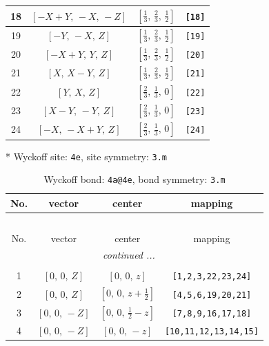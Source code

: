 \documentclass[fleqn,8pt]{jsarticle}
\begin{document}
\begin{longtable}{cccc}
18 & $\left[ - X + Y,\, - X,\, - Z \right]$ & $\left[ \frac{1}{3},\, \frac{2}{3},\, \frac{1}{2} \right]$ & {\tt [18]} \\ \hline
19 & $\left[ - Y,\, - X,\, Z \right]$ & $\left[ \frac{1}{3},\, \frac{2}{3},\, \frac{1}{2} \right]$ & {\tt [19]} \\ \hline
20 & $\left[ - X + Y,\, Y,\, Z \right]$ & $\left[ \frac{1}{3},\, \frac{2}{3},\, \frac{1}{2} \right]$ & {\tt [20]} \\ \hline
21 & $\left[ X,\, X - Y,\, Z \right]$ & $\left[ \frac{1}{3},\, \frac{2}{3},\, \frac{1}{2} \right]$ & {\tt [21]} \\ \hline
22 & $\left[ Y,\, X,\, Z \right]$ & $\left[ \frac{2}{3},\, \frac{1}{3},\, 0 \right]$ & {\tt [22]} \\ \hline
23 & $\left[ X - Y,\, - Y,\, Z \right]$ & $\left[ \frac{2}{3},\, \frac{1}{3},\, 0 \right]$ & {\tt [23]} \\ \hline
24 & $\left[ - X,\, - X + Y,\, Z \right]$ & $\left[ \frac{2}{3},\, \frac{1}{3},\, 0 \right]$ & {\tt [24]} \\
\end{longtable}
* Wyckoff site: {\tt 4e}, site symmetry: {\tt 3.m}
\renewcommand{\arraystretch}{1.2}
\begin{longtable}{cccc}
\caption{Wyckoff bond: {\tt 4a@4e}, bond symmetry: {\tt 3.m}}
 \\
 \hline \hline
No. & vector & center & mapping \\ \hline \endfirsthead

\multicolumn{3}{l}{\tablename\ \thetable{}} \\
 \hline \hline
No. & vector & center & mapping \\ \hline \endhead

 \hline \hline
\multicolumn{3}{r}{\footnotesize\it continued ...} \\ \endfoot

 \hline \hline
\multicolumn{3}{r}{} \\ \endlastfoot

1 & $\left[ 0,\, 0,\, Z \right]$ & $\left[ 0,\, 0,\, z \right]$ & {\tt [1,2,3,22,23,24]} \\ \hline
2 & $\left[ 0,\, 0,\, Z \right]$ & $\left[ 0,\, 0,\, z + \frac{1}{2} \right]$ & {\tt [4,5,6,19,20,21]} \\ \hline
3 & $\left[ 0,\, 0,\, - Z \right]$ & $\left[ 0,\, 0,\, \frac{1}{2} - z \right]$ & {\tt [7,8,9,16,17,18]} \\ \hline
4 & $\left[ 0,\, 0,\, - Z \right]$ & $\left[ 0,\, 0,\, - z \right]$ & {\tt [10,11,12,13,14,15]} \\
\end{longtable}
\end{document}
